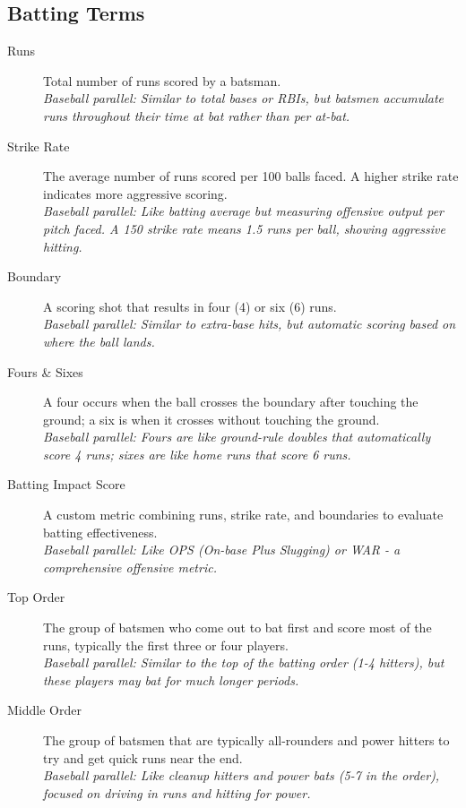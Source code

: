 \documentclass{article}[12pt]
\begin{document}
\subsection*{Batting Terms}
\begin{description}
    \item[Runs] Total number of runs scored by a batsman.\\
    \textit{Baseball parallel: Similar to total bases or RBIs, but batsmen accumulate runs throughout their time at bat rather than per at-bat.}
    
    \item[Strike Rate] The average number of runs scored per 100 balls faced. A higher strike rate indicates more aggressive scoring.\\
    \textit{Baseball parallel: Like batting average but measuring offensive output per pitch faced. A 150 strike rate means 1.5 runs per ball, showing aggressive hitting.}

    \item[Boundary] A scoring shot that results in four (4) or six (6) runs.\\
    \textit{Baseball parallel: Similar to extra-base hits, but automatic scoring based on where the ball lands.}

    \item[Fours \& Sixes] A four occurs when the ball crosses the boundary after touching the ground; a six is when it crosses without touching the ground.\\
    \textit{Baseball parallel: Fours are like ground-rule doubles that automatically score 4 runs; sixes are like home runs that score 6 runs.}

    \item[Batting Impact Score] A custom metric combining runs, strike rate, and boundaries to evaluate batting effectiveness.\\
    \textit{Baseball parallel: Like OPS (On-base Plus Slugging) or WAR - a comprehensive offensive metric.}

    \item[Top Order] The group of batsmen who come out to bat first and score most of the runs, typically the first three or four players.\\
    \textit{Baseball parallel: Similar to the top of the batting order (1-4 hitters), but these players may bat for much longer periods.}

    \item[Middle Order] The group of batsmen that are typically all-rounders and power hitters to try and get quick runs near the end.\\
    \textit{Baseball parallel: Like cleanup hitters and power bats (5-7 in the order), focused on driving in runs and hitting for power.}
\end{description}
\end{document}
